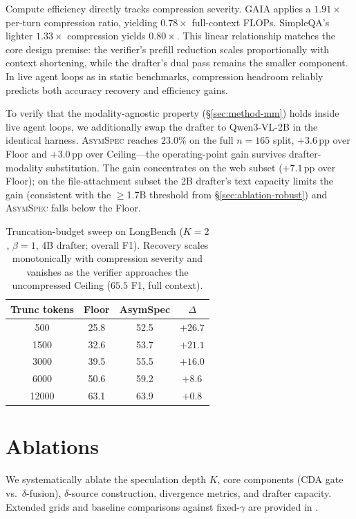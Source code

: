 \documentclass[11pt]{article}
\theoremstyle{plain}
\theoremstyle{definition}
\begin{document}
Compute efficiency directly tracks compression severity. GAIA applies a $1.91\times$ per-turn compression ratio, yielding $0.78\times$ full-context FLOPs. SimpleQA's lighter $1.33\times$ compression yields $0.80\times$. This linear relationship matches the core design premise: the verifier's prefill reduction scales proportionally with context shortening, while the drafter's dual pass remains the smaller component. In live agent loops as in static benchmarks, compression headroom reliably predicts both accuracy recovery and efficiency gains.

To verify that the modality-agnostic property (\S\ref{sec:method-mm}) holds inside live agent loops, we additionally swap the drafter to Qwen3-VL-2B in the identical harness. \textsc{AsymSpec} reaches $23.0\%$ on the full $n{=}165$ split, $+3.6$\,pp over Floor and $+3.0$\,pp over Ceiling---the operating-point gain survives drafter-modality substitution. The gain concentrates on the web subset ($+7.1$\,pp over Floor); on the file-attachment subset the 2B drafter's text capacity limits the gain (consistent with the $\ge$1.7B threshold from \S\ref{sec:ablation-robust}) and \textsc{AsymSpec} falls below the Floor.

\begin{table}[h!]
\centering
\footnotesize
\setlength{\tabcolsep}{8pt}
\begin{tabular}{cccc}
\toprule
Trunc tokens & Floor & AsymSpec & $\Delta$ \\
\midrule
500    & 25.8 & 52.5 & $+26.7$ \\
1500   & 32.6 & 53.7 & $+21.1$ \\
3000   & 39.5 & 55.5 & $+16.0$ \\
6000   & 50.6 & 59.2 & $+8.6$  \\
12000  & 63.1 & 63.9 & $+0.8$  \\
\bottomrule
\end{tabular}
\caption{Truncation-budget sweep on LongBench ($K{=}2$, $\beta{=}1$, 4B drafter; overall F1). Recovery scales monotonically with compression severity and vanishes as the verifier approaches the uncompressed Ceiling ($65.5$ F1, full context).}
\label{tab:trunc_ratio}
\end{table}


\section{Ablations}
\label{sec:ablations}

We systematically ablate the speculation depth $K$, core components (CDA gate vs.\ $\delta$-fusion), $\delta$-source construction, divergence metrics, and drafter capacity. Extended grids and baseline comparisons against fixed-$\gamma$ are provided in .
\end{document}
